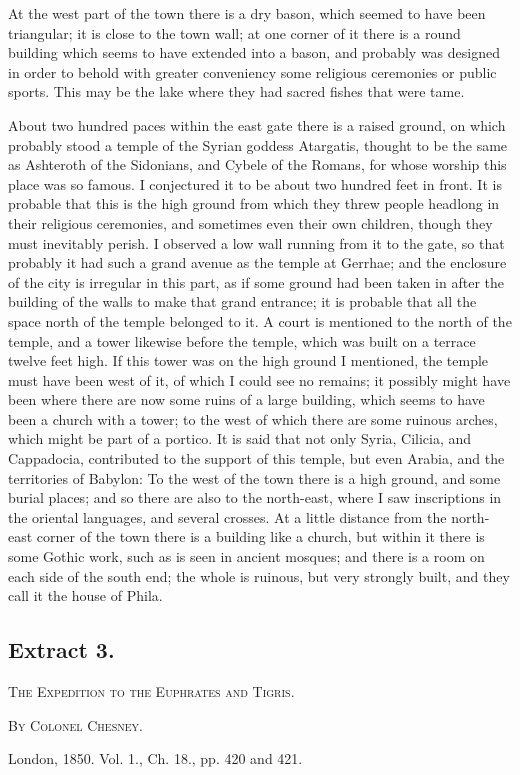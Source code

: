 \documentclass[a4paper, 11pt, oneside, polutonikogreek, english]{article}
\begin{document}
At the west part of the town there is a dry bason, which seemed to have been triangular; it is close to the town wall; at one corner of it there is a round building which seems to have extended into a bason, and probably was designed in order to behold with greater conveniency some religious ceremonies or public sports. This may be the lake where they had sacred fishes that were tame.

About two hundred paces within the east gate there is a raised ground, on which probably stood a temple of the Syrian goddess Atargatis, thought to be the same as Ashteroth of the Sidonians, and Cybele of the Romans, for whose worship this place was so famous. I conjectured it to be about two hundred feet in front. It is probable that this is the high ground from which they threw people headlong in their religious ceremonies, and sometimes even their own children, though they must inevitably perish. I observed a low wall running from it to the gate, so that probably it had such a grand avenue as the temple at Gerrhae; and the enclosure of the city is irregular in this part, as if some ground had been taken in after the building of the walls to make that grand entrance; it is probable that all the space north of the temple belonged to it. A court is mentioned to the north of the temple, and a tower likewise before the temple, which was built on a terrace twelve feet high. If this tower was on the high ground I mentioned, the temple must have been west of it, of which I could see no remains; it possibly might have been where there are now some ruins of a large building, which seems to have been a church with a tower; to the west of which there are some ruinous arches, which might be part of a portico. It is said that not only Syria, Cilicia, and Cappadocia, contributed to the support of this temple, but even Arabia, and the territories of Babylon: To the west of the town there is a high ground, and some burial places; and so there are also to the north-east, where I saw inscriptions in the oriental languages, and several crosses. At a little distance from the north-east corner of the town there is a building like a church, but within it there is some Gothic work, such as is seen in ancient mosques; and there is a room on each side of the south end; the whole is ruinous, but very strongly built, and they call it the house of Phila.
\clearpage
\subsection{Extract 3.}
\begin{center}
\textsc{The Expedition to the Euphrates and Tigris.}

\textsc{By Colonel Chesney.}

London, 1850. Vol. 1., Ch. 18., pp. 420 and 421.
\end{center}
\end{document}
